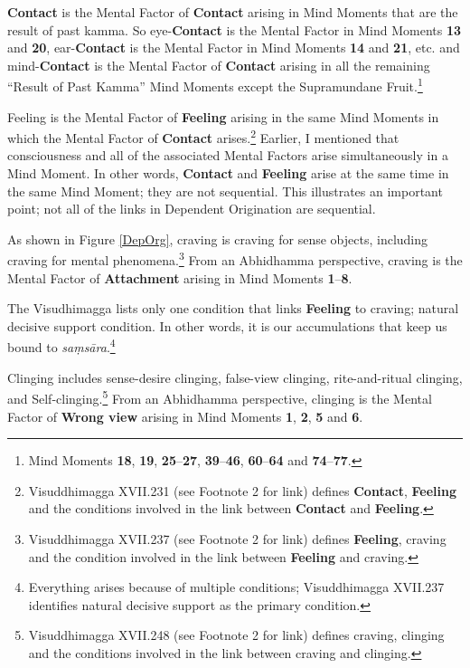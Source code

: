 \textbf{Contact} is the Mental Factor of \textbf{Contact} arising in Mind Moments that are the result of past kamma. So eye-\textbf{Contact} is the Mental Factor in Mind Moments \textbf{13} and \textbf{20}, ear-\textbf{Contact} is the Mental Factor in Mind Moments \textbf{14} and \textbf{21}, etc. and mind-\textbf{Contact} is the Mental Factor of \textbf{Contact} arising in all the remaining “Result of Past Kamma” Mind Moments except the Supramundane Fruit.\footnote{Mind Moments \textbf{18}, \textbf{19}, \textbf{25}--\textbf{27}, \textbf{39}--\textbf{46}, \textbf{60}--\textbf{64} and \textbf{74}--\textbf{77}.}

Feeling is the Mental Factor of \textbf{Feeling} arising in the same Mind Moments in which the Mental Factor of \textbf{Contact} arises.\footnote{Visuddhimagga XVII.231 (see Footnote 2 for link) defines \textbf{Contact}, \textbf{Feeling} and the conditions involved in the link between \textbf{Contact} and \textbf{Feeling}.} Earlier, I mentioned that consciousness and all of the associated Mental Factors arise simultaneously in a Mind Moment. In other words, \textbf{Contact} and \textbf{Feeling} arise at the same time in the same Mind Moment; they are not sequential. This illustrates an important point; not all of the links in Dependent Origination are sequential.

\pagebreak

As shown in Figure \ref{DepOrg}, craving is craving for sense objects, including craving for mental phenomena.\footnote{Visuddhimagga XVII.237 (see Footnote 2 for link) defines \textbf{Feeling}, craving and the condition involved in the link between \textbf{Feeling} and craving.} From an Abhidhamma perspective, craving is the Mental Factor of \textbf{Attachment} arising in Mind Moments \textbf{1}--\textbf{8}.

The Visudhimagga lists only one condition that links \textbf{Feeling} to craving; natural decisive support condition. In other words, it is our accumulations that keep us bound to \textit{saṃsāra}.\footnote{Everything arises because of multiple conditions; Visuddhimagga XVII.237 identifies natural decisive support as the primary condition.}

Clinging includes sense-desire clinging, false-view clinging, rite-and-ritual clinging, and Self-clinging.\footnote{Visuddhimagga XVII.248 (see Footnote 2 for link) defines craving, clinging and the conditions involved in the link between craving and clinging.} From an Abhidhamma perspective, clinging is the Mental Factor of \textbf{Wrong view} arising in Mind Moments \textbf{1}, \textbf{2}, \textbf{5} and \textbf{6}.

